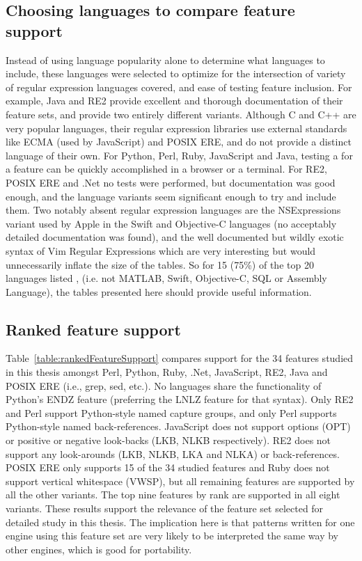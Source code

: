 \subsection{Choosing languages to compare feature support}
\label{sec:languagesChosen}
Instead of using language popularity alone to determine what languages to include, these languages were selected to optimize for the intersection of variety of regular expression languages covered, and ease of testing feature inclusion.  For example, Java and RE2 provide excellent and thorough documentation of their feature sets, and provide two entirely different variants.  Although C and C++ are very popular languages, their regular expression libraries use external standards like ECMA (used by JavaScript) and POSIX ERE, and do not provide a distinct language of their own.  For Python, Perl, Ruby, JavaScript and Java, testing a for a feature can be quickly accomplished in a browser or a terminal.  For RE2, POSIX ERE and .Net no tests were performed, but documentation was good enough, and the language variants seem significant enough to try and include them.  Two notably absent regular expression languages are the NSExpressions variant used by Apple in the Swift and Objective-C languages (no acceptably detailed documentation was found), and the well documented but wildly exotic syntax of Vim Regular Expressions which are very interesting but would unnecessarily inflate the size of the tables. So for 15 (75\%) of the top 20 languages listed , (i.e. not MATLAB, Swift, Objective-C, SQL or Assembly Language), the tables presented here should provide useful information.




\subsection{Ranked feature support}
Table~\ref{table:rankedFeatureSupport} compares support for the 34 features studied in this thesis amongst Perl, Python, Ruby, .Net, JavaScript, RE2, Java and POSIX ERE (i.e., grep, sed, etc.).  No languages share the functionality of Python's ENDZ feature (preferring the LNLZ feature for that syntax).  Only RE2 and Perl support Python-style named capture groups, and only Perl supports Python-style named back-references.  JavaScript does not support options (OPT) or positive or negative look-backs (LKB, NLKB respectively).  RE2 does not support any look-arounds (LKB, NLKB, LKA and NLKA) or back-references.  POSIX ERE only supports 15 of the 34 studied features and Ruby does not support vertical whitespace (VWSP), but all remaining features are supported by all the other variants.  The top nine features by rank are supported in all eight variants.  These results support the relevance of the feature set selected for detailed study in this thesis.  The implication here is that patterns written for one engine using this feature set are very likely to be interpreted the same way by other engines, which is good for portability.

